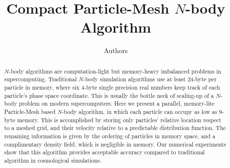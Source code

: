 \documentclass[10pt,twocolumn,preprint]{emulateapj}
\begin{document}
\title{Compact Particle-Mesh $N$-body Algorithm}
\author{Authors}



\begin{abstract}
$N$-body algorithms are computation-light but memory-heavy imbalanced problems in supercomputing. Traditional $N$-body simulation algorithms use at least 24-byte per particle in memory, where six 4-byte single precision real numbers keep track of each particle's phase space coordinate. This is usually the bottle neck of scaling-up of a $N$-body problem on modern supercomputers. Here we present a parallel, memory-lite Particle-Mesh based $N$-body algorithm, in which each particle can occupy as low as 9-byte memory. This is accomplished by storing only particles' relative location respect to a meshed grid, and their velocity relative to a predictable distribution function. The remaining information is given by the ordering of particles in memory space, and a complimentary density field, which is negligible in memory. Our numerical experiments show that this algorithm provides acceptable accuracy compared to traditional algorithm in cosmological simulations.

\end{abstract}

\keywords{}

\maketitle
\end{document}
